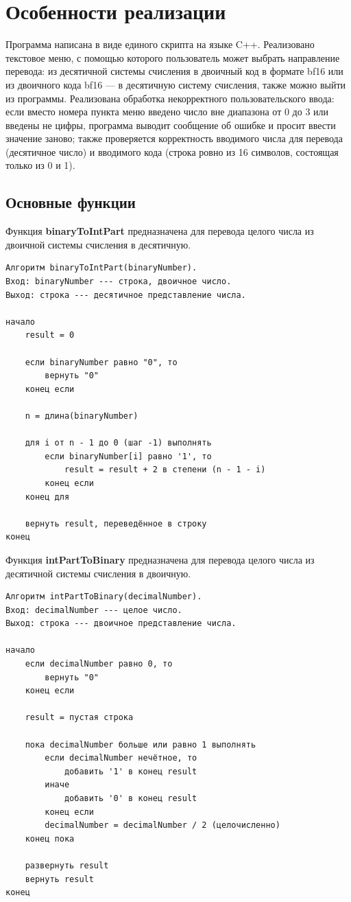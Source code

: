 \section{Особенности реализации}
Программа написана в виде единого скрипта на языке C++. Реализовано текстовое меню,
с помощью которого пользователь может выбрать направление перевода:
из десятичной системы счисления в двоичный код в формате bf16 или из
двоичного кода bf16 --- в десятичную систему счисления,
также можно выйти из программы.
Реализована обработка некорректного
пользовательского ввода: если вместо номера пункта меню введено число
вне диапазона от 0 до 3 или введены не цифры, программа выводит
сообщение об ошибке и просит ввести значение заново; также проверяется
корректность вводимого числа для перевода (десятичное число) и
вводимого кода (строка ровно из 16 символов, состоящая только из 0 и 1).

\subsection{Основные функции}

Функция \textbf{binaryToIntPart} предназначена для перевода целого числа
из двоичной системы счисления в десятичную.

\begin{verbatim}
Алгоритм binaryToIntPart(binaryNumber).
Вход: binaryNumber --- строка, двоичное число.
Выход: строка --- десятичное представление числа.

начало
    result = 0

    если binaryNumber равно "0", то
        вернуть "0"
    конец если

    n = длина(binaryNumber)

    для i от n - 1 до 0 (шаг -1) выполнять
        если binaryNumber[i] равно '1', то
            result = result + 2 в степени (n - 1 - i)
        конец если
    конец для

    вернуть result, переведённое в строку
конец
\end{verbatim}

Функция \textbf{intPartToBinary} предназначена для
перевода целого числа из десятичной системы счисления
в двоичную.

\begin{verbatim}
Алгоритм intPartToBinary(decimalNumber).
Вход: decimalNumber --- целое число.
Выход: строка --- двоичное представление числа.

начало
    если decimalNumber равно 0, то
        вернуть "0"
    конец если

    result = пустая строка

    пока decimalNumber больше или равно 1 выполнять
        если decimalNumber нечётное, то
            добавить '1' в конец result
        иначе
            добавить '0' в конец result
        конец если
        decimalNumber = decimalNumber / 2 (целочисленно)
    конец пока

    развернуть result
    вернуть result
конец
\end{verbatim}

